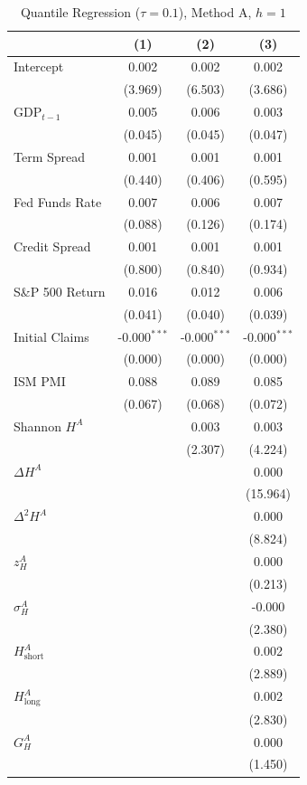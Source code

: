 \begin{table}[htbp]
\centering
\caption{Quantile Regression ($\tau = 0.1$), Method A, $h = 1$}
\label{tab:qr_coef_A_h1}
\footnotesize
\begin{tabular}{lccc}
\toprule
 & (1) & (2) & (3) \\
\midrule
  Intercept & 0.002 & 0.002 & 0.002 \\
  & (3.969) & (6.503) & (3.686) \\[2pt]
  GDP$_{t-1}$ & 0.005 & 0.006 & 0.003 \\
  & (0.045) & (0.045) & (0.047) \\[2pt]
  Term Spread & 0.001 & 0.001 & 0.001 \\
  & (0.440) & (0.406) & (0.595) \\[2pt]
  Fed Funds Rate & 0.007 & 0.006 & 0.007 \\
  & (0.088) & (0.126) & (0.174) \\[2pt]
  Credit Spread & 0.001 & 0.001 & 0.001 \\
  & (0.800) & (0.840) & (0.934) \\[2pt]
  S\&P 500 Return & 0.016 & 0.012 & 0.006 \\
  & (0.041) & (0.040) & (0.039) \\[2pt]
  Initial Claims & -0.000$^{***}$ & -0.000$^{***}$ & -0.000$^{***}$ \\
  & (0.000) & (0.000) & (0.000) \\[2pt]
  ISM PMI & 0.088 & 0.089 & 0.085 \\
  & (0.067) & (0.068) & (0.072) \\[2pt]
  Shannon $H^A$ &  & 0.003 & 0.003 \\
  &  & (2.307) & (4.224) \\[2pt]
  $\Delta H^A$ &  &  & 0.000 \\
  &  &  & (15.964) \\[2pt]
  $\Delta^2 H^A$ &  &  & 0.000 \\
  &  &  & (8.824) \\[2pt]
  $z^A_H$ &  &  & 0.000 \\
  &  &  & (0.213) \\[2pt]
  $\sigma^A_H$ &  &  & -0.000 \\
  &  &  & (2.380) \\[2pt]
  $H^A_{\mathrm{short}}$ &  &  & 0.002 \\
  &  &  & (2.889) \\[2pt]
  $H^A_{\mathrm{long}}$ &  &  & 0.002 \\
  &  &  & (2.830) \\[2pt]
  $G^A_H$ &  &  & 0.000 \\
  &  &  & (1.450) \\[2pt]
\bottomrule
\end{tabular}
\end{table}